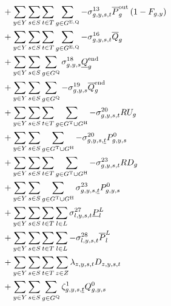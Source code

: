 \documentclass{article}
\begin{document}
\begin{align}
& + \sum\limits_{\iYear \in \sYears}\sum\limits_{\iScenario \in \sScenarios}\sum\limits_{\iInterval \in \sIntervals} \sum\limits_{\iGenerator \in \sStorageExisting} - \dMaxDischargingRateExisting \cPowerDischargingMax \left(1 - \cRetirementIndicator\right)\\
& + \sum\limits_{\iYear \in \sYears}\sum\limits_{\iScenario \in \sScenarios}\sum\limits_{\iInterval \in \sIntervals} \sum\limits_{\iGenerator \in \sStorageExisting} - \dMaxStorageEnergyExisting \cStorageUnitEnergyMax\\
& + \sum\limits_{\iYear \in \sYears}\sum\limits_{\iScenario \in \sScenarios} \sum\limits_{\iGenerator \in \sStorage} \dMinStorageEnergyIntervalEnd \cStorageUnitEnergyIntervalEndMin\\
& + \sum\limits_{\iYear \in \sYears}\sum\limits_{\iScenario \in \sScenarios} \sum\limits_{\iGenerator \in \sStorage} - \dMaxStorageEnergyIntervalEnd \cStorageUnitEnergyIntervalEndMax\\
%
& + \sum\limits_{\iYear \in \sYears}\sum\limits_{\iScenario \in \sScenarios}\sum\limits_{\iInterval \in \sIntervals} \sum\limits_{\iGenerator \in \sGeneratorsThermal \cup \sGeneratorsHydro} - \dRampRateUp \cRampRateUp\\
& + \sum\limits_{\iYear \in \sYears}\sum\limits_{\iScenario \in \sScenarios} \sum\limits_{\iGenerator \in \sGeneratorsThermal \cup \sGeneratorsHydro} - \dRampRateUp[\iGenerator,\iYear,\iScenario,\iIntervalStart] \cPowerInitial\\
& + \sum\limits_{\iYear \in \sYears}\sum\limits_{\iScenario \in \sScenarios}\sum\limits_{\iInterval \in \sIntervals} \sum\limits_{\iGenerator \in \sGeneratorsThermal \cup \sGeneratorsHydro} - \dRampRateDown \cRampRateDown\\
& + \sum\limits_{\iYear \in \sYears}\sum\limits_{\iScenario \in \sScenarios} \sum\limits_{\iGenerator \in \sGeneratorsThermal \cup \sGeneratorsHydro} \dRampRateDown[\iGenerator,\iYear,\iScenario,\iIntervalStart] \cPowerInitial\\
& + \sum\limits_{\iYear \in \sYears}\sum\limits_{\iScenario \in \sScenarios}\sum\limits_{\iInterval \in \sIntervals} \sum\limits_{\iLink \in \sLinks} \dMinPowerFlow \cPowerFlowMin\\
& + \sum\limits_{\iYear \in \sYears}\sum\limits_{\iScenario \in \sScenarios}\sum\limits_{\iInterval \in \sIntervals} \sum\limits_{\iLink \in \sLinks} - \dMaxPowerFlow \cPowerFlowMax\\
& + \sum\limits_{\iYear \in \sYears}\sum\limits_{\iScenario \in \sScenarios}\sum\limits_{\iInterval \in \sIntervals} \sum\limits_{\iZone \in \sZones} \dPowerBalance \cDemand\\
& + \sum\limits_{\iYear \in \sYears}\sum\limits_{\iScenario \in \sScenarios}\sum\limits_{\iGenerator \in \sStorage} \dStorageEnergyTransition[\iGenerator,\iYear,\iScenario,\iIntervalStart] \cStorageEnergyInitial\\
\end{align}
\end{document}
